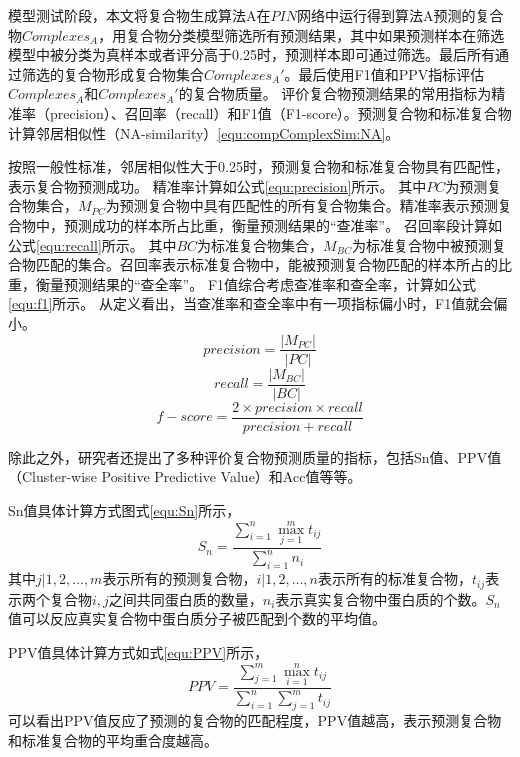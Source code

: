 模型测试阶段，本文将复合物生成算法A在$PIN$网络中运行得到算法A预测的复合物$Complexes_A$，用复合物分类模型筛选所有预测结果，其中如果预测样本在筛选模型中被分类为真样本或者评分高于0.25时，预测样本即可通过筛选。最后所有通过筛选的复合物形成复合物集合$Complexes_A'$。最后使用F1值和PPV指标评估$Complexes_A$和$Complexes_A'$的复合物质量。
评价复合物预测结果的常用指标为精准率（precision）、召回率（recall）和F1值（F1-score）。预测复合物和标准复合物计算邻居相似性（NA-similarity）\ref{equ:compComplexSim:NA}。

按照一般性标准，邻居相似性大于0.25时，预测复合物和标准复合物具有匹配性，表示复合物预测成功。
精准率计算如公式\ref{equ:precision}所示。
其中$PC$为预测复合物集合，$M_{PC}$为预测复合物中具有匹配性的所有复合物集合。精准率表示预测复合物中，预测成功的样本所占比重，衡量预测结果的“查准率”。
召回率段计算如公式\ref{equ:recall}所示。
其中$BC$为标准复合物集合，$M_{BC}$为标准复合物中被预测复合物匹配的集合。召回率表示标准复合物中，能被预测复合物匹配的样本所占的比重，衡量预测结果的“查全率”。
F1值综合考虑查准率和查全率，计算如公式\ref{equ:f1}所示。
从定义看出，当查准率和查全率中有一项指标偏小时，F1值就会偏小。
\begin{equation}
    \label{equ:precision}
    precision=\frac{\left\lvert M_{PC}\right\rvert }{\left\lvert PC\right\rvert }
\end{equation}
\begin{equation}
    \label{equ:recall}
    recall=\frac{\left\lvert M_{BC}\right\rvert }{\left\lvert BC\right\rvert }
\end{equation}
\begin{equation}
    \label{equ:f1}
    f-score=\frac{2\times precision\times recall}{precision + recall }
\end{equation}

除此之外，研究者还提出了多种评价复合物预测质量的指标\cite{shi_protein_2011}，包括Sn值、PPV值（Cluster-wise Positive Predictive Value）和Acc值等等。

Sn值具体计算方式图式\ref{equ:Sn}所示，
\begin{equation}
    \label{equ:Sn}
    S_n=\frac{\sum_{i = 1}^{n} \max_{j=1}^{m} t_{ij}}{\sum_{i = 1}^{n}n_i}
\end{equation}
其中${j| 1,2,\dots,m }$表示所有的预测复合物，${i| 1,2,\dots,n }$表示所有的标准复合物，$t_{ij}$表示两个复合物$i,j$之间共同蛋白质的数量，$n_i$表示真实复合物中蛋白质的个数。$S_n$值可以反应真实复合物中蛋白质分子被匹配到个数的平均值。

PPV值具体计算方式如式\ref{equ:PPV}所示，
\begin{equation}
    \label{equ:PPV}
    PPV=\frac{\sum_{j = 1}^{m} \max_{i=1}^{n} t_{ij}}{\sum_{i = 1}^{n} \sum_{j = 1}^{m}   t_{ij}}
\end{equation}
可以看出PPV值反应了预测的复合物的匹配程度，PPV值越高，表示预测复合物和标准复合物的平均重合度越高。

